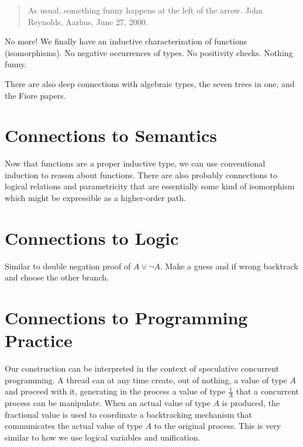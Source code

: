 \documentclass[11pt]{article}
\begin{document}
\begin{quote} 
As usual, something funny happens at the left of the arrow. John Reynolds,
Aarhus, June 27, 2000.~\cite{danvypage} 
\end{quote}

No more! We finally have an inductive characterization of functions
(isomorphisms). No negative occurrences of types. No positivity
checks. Nothing funny.

There are also deep connections with algebraic types, the seven trees in one,
and the Fiore papers.

\section{Connections to Semantics} 

Now that functions are a proper inductive type, we can use conventional
induction to reason about functions. There are also probably connections to
logical relations and parametricity that are essentially some kind of
isomorphism which might be expressible as a higher-order path.

\section{Connections to Logic} 

Similar to double negation proof of $A \vee \neg A$. Make a guess and if
wrong backtrack and choose the other branch.

\section{Connections to Programming Practice} 

Our construction can be interpreted in the context of speculative concurrent
programming. A thread can at any time create, out of nothing, a value of type
$A$ and proceed with it, generating in the process a value of type
$\frac{1}{A}$ that a concurrent process can be manipulate. When an actual
value of type $A$ is produced, the fractional value is used to coordinate a
backtracking mechanism that communicates the actual value of type $A$ to the
original process. This is very similar to how we use logical variables and
unification.
\end{document}
